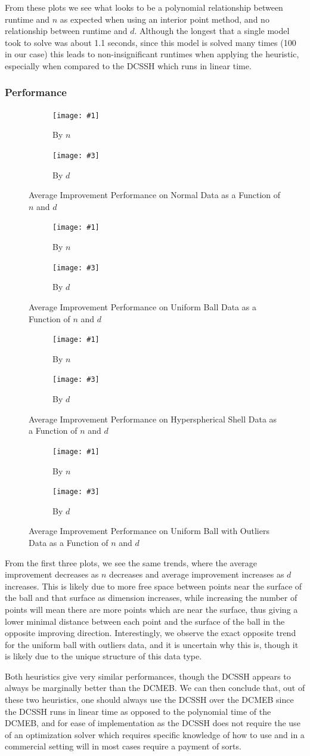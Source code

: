 \documentclass[11pt,twoside]{report}
\newcommand{\pairfigure}[6]{
    \begin{figure}[ht]
        \centering
        \begin{subfigure}[b]{0.475\textwidth}
            \centering
            \texttt{[image: \#1]}
            \caption{#2}
            \label{#6_#2}
        \end{subfigure}
        \hfill
        \begin{subfigure}[b]{0.475\textwidth}
            \centering
            \texttt{[image: \#3]}
            \caption{#4}
            \label{#6_#4}
        \end{subfigure}
        \caption{#5}
        \label{#6}
\end{figure}
}
\newcommand{\imprfigure}[3]{
    \pairfigure{improvement_r_benchmarks/avg_pct_func_n_d100_eta0p9_#1.png}{By $n$}{improvement_r_benchmarks/avg_pct_func_d_n1000_eta0p9_#1.png}{By $d$}{#2}{#3}
}
\theoremstyle{definition}
\numberwithin{theorem}{section}
\numberwithin{definition}{section}
\numberwithin{lemma}{section}
\numberwithin{proposition}{section}
\numberwithin{equation}{section}
\numberwithin{figure}{section}
\begin{document}
From these plots we see what looks to be a polynomial relationship between runtime and $n$ as expected when using an interior point method, and no relationship between runtime and $d$. Although the longest that a single model took to solve was about 1.1 seconds, since this model is solved many times (100 in our case) this leads to non-insignificant runtimes when applying the heuristic, especially when compared to the DCSSH which runs in linear time.

\subsubsection{Performance}
\imprfigure{normal}{Average Improvement Performance on Normal Data as a Function of $n$ and $d$}{fig:improvement_normal}

\imprfigure{uniform_ball}{Average Improvement Performance on Uniform Ball Data as a Function of $n$ and $d$}{fig:improvement_unifball}

\imprfigure{hyperspherical_shell}{Average Improvement Performance on Hyperspherical Shell Data as a Function of $n$ and $d$}{fig:improvement_hypshell}

\imprfigure{uniform_ball_with_outliers}{Average Improvement Performance on Uniform Ball with Outliers Data as a Function of $n$ and $d$}{fig:improvement_unifballwoutliers}

From the first three plots, we see the same trends, where the average improvement decreases as $n$ decreases and average improvement increases as $d$ increases. This is likely due to more free space between points near the surface of the ball and that surface as dimension increases, while increasing the number of points will mean there are more points which are near the surface, thus giving a lower minimal distance between each point and the surface of the ball in the opposite improving direction. Interestingly, we observe the exact opposite trend for the uniform ball with outliers data, and it is uncertain why this is, though it is likely due to the unique structure of this data type.

Both heuristics give very similar performances, though the DCSSH appears to always be marginally better than the DCMEB. We can then conclude that, out of these two heuristics, one should always use the DCSSH over the DCMEB since the DCSSH runs in linear time as opposed to the polynomial time of the DCMEB, and for ease of implementation as the DCSSH does not require the use of an optimization solver which requires specific knowledge of how to use and in a commercial setting will in most cases require a payment of sorts.
\end{document}
